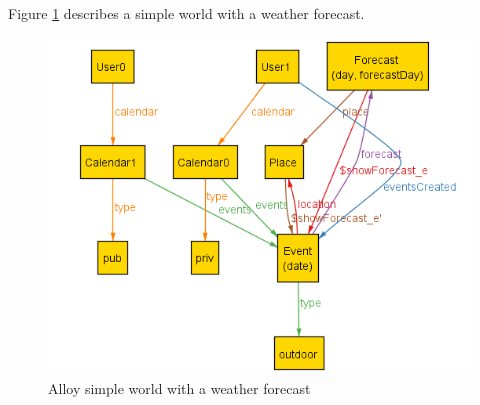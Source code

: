 \documentclass[10pt,a4paper,titlepage]{article}
\begin{document}
Figure \ref{fig:AlloyForecast} describes a simple world with a weather forecast.
\begin{figure}[h!]
\centering
\includegraphics[width=\linewidth]{./Alloy/ShowForecast.png}
\caption[Forecast]{Alloy simple world with a weather forecast}
\label{fig:AlloyForecast}
\end{figure}
\end{document}
